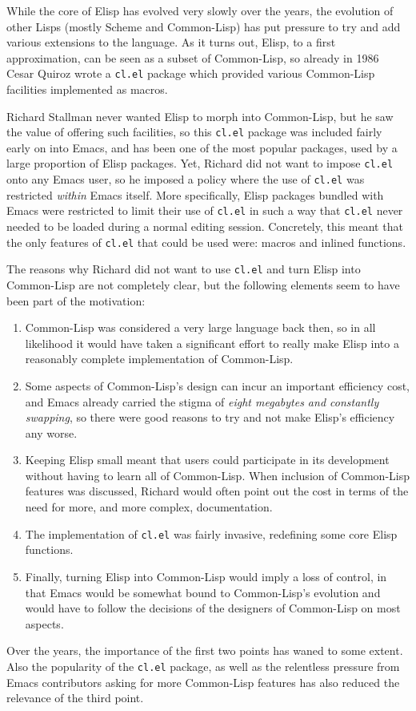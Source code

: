 \documentclass[format=acmsmall, review=false, screen=true]{acmart}
\newcommand \Elisp {Elisp}
\begin{document}
While the core of \Elisp{} has evolved very slowly over the years, the
evolution of other Lisps (mostly Scheme and Common-Lisp) has put pressure to
try and add various extensions to the language.  As it turns out, \Elisp{},
to a first approximation, can be seen as a subset of Common-Lisp, so already
in 1986 Cesar Quiroz wrote a \texttt{cl.el} package which provided various
Common-Lisp facilities implemented as macros.

Richard Stallman never wanted \Elisp{} to morph into Common-Lisp, but he saw
the value of offering such facilities, so this \texttt{cl.el} package was
included fairly early on into Emacs, and has been one of the most popular
packages, used by a large proportion of \Elisp{} packages.  Yet, Richard did
not want to impose \texttt{cl.el} onto any Emacs user, so he imposed
a policy where the use of \texttt{cl.el} was restricted \emph{within} Emacs
itself.  More specifically, \Elisp{} packages bundled with Emacs were
restricted to limit their use of \texttt{cl.el} in such a way that
\texttt{cl.el} never needed to be loaded during a normal editing session.
Concretely, this meant that the only features of \texttt{cl.el} that could
be used were: macros and inlined functions.

The reasons why Richard did not want to use \texttt{cl.el} and turn \Elisp{}
into Common-Lisp are not completely clear, but the following elements seem
to have been part of the motivation:
\begin{enumerate}
\item Common-Lisp was considered a very large language back then, so in all
  likelihood it would have taken a significant effort to really make
  \Elisp{} into a reasonably complete implementation of Common-Lisp.
\item Some aspects of Common-Lisp's design can incur an important efficiency
  cost, and Emacs already carried the stigma of \emph{eight megabytes and
    constantly swapping}, so there were good reasons to try and not make
  \Elisp{}'s efficiency any worse.
\item Keeping \Elisp{} small meant that users could participate in its
  development without having to learn all of Common-Lisp.  When inclusion of
  Common-Lisp features was discussed, Richard would often point out the cost
  in terms of the need for more, and more complex, documentation.
\item The implementation of \texttt{cl.el} was fairly invasive, redefining
  some core \Elisp{} functions.
\item Finally, turning \Elisp{} into Common-Lisp would imply a loss of control,
  in that Emacs would be somewhat bound to Common-Lisp's evolution and would
  have to follow the decisions of the designers of Common-Lisp on most aspects.
\end{enumerate}
Over the years, the importance of the first two points has waned to some
extent.  Also the popularity of the \texttt{cl.el} package, as well as the
relentless pressure from Emacs contributors asking for more Common-Lisp
features has also reduced the relevance of the third point.
\end{document}
